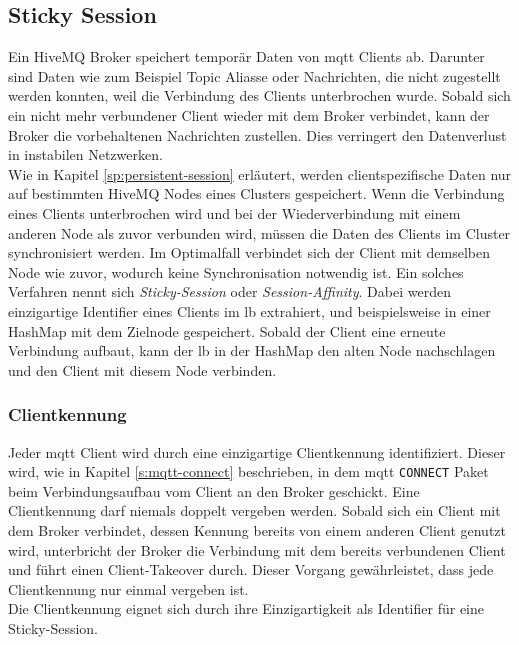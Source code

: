 \subsection{Sticky Session} \label{ss:sticky-session}
Ein HiveMQ Broker speichert temporär Daten von \ac{mqtt} Clients ab. Darunter sind Daten wie zum Beispiel Topic Aliasse oder Nachrichten, die nicht zugestellt werden konnten, weil die Verbindung des Clients unterbrochen wurde.
Sobald sich ein nicht mehr verbundener Client wieder mit dem Broker verbindet, kann der Broker die vorbehaltenen Nachrichten zustellen.
Dies verringert den Datenverlust in instabilen Netzwerken.
\\
Wie in Kapitel \ref{sp:persistent-session} erläutert, werden clientspezifische Daten nur auf bestimmten HiveMQ Nodes eines Clusters gespeichert.
Wenn die Verbindung eines Clients unterbrochen wird und bei der Wiederverbindung mit einem anderen Node als zuvor verbunden wird, müssen die Daten des Clients im Cluster synchronisiert werden.
Im Optimalfall verbindet sich der Client mit demselben Node wie zuvor, wodurch keine Synchronisation notwendig ist.
Ein solches Verfahren nennt sich \textit{Sticky-Session} oder \textit{Session-Affinity}. Dabei werden einzigartige Identifier eines Clients im \acl{lb} extrahiert, und beispielsweise in einer HashMap mit dem Zielnode gespeichert. Sobald der Client eine erneute Verbindung aufbaut, kann der \acl{lb} in der HashMap den alten Node nachschlagen und den Client mit diesem Node verbinden. \cite{WhatDoesTerm}

\subsubsection{Clientkennung} \label{ss:clientid}
Jeder \ac{mqtt} Client wird durch eine einzigartige Clientkennung identifiziert. Dieser wird, wie in Kapitel \ref{s:mqtt-connect} beschrieben, in dem \ac{mqtt} \verb|CONNECT| Paket beim Verbindungsaufbau vom Client an den Broker geschickt.
Eine Clientkennung darf niemals doppelt vergeben werden. Sobald sich ein Client mit dem Broker verbindet, dessen Kennung bereits von einem anderen Client genutzt wird, unterbricht der Broker die Verbindung mit dem bereits verbundenen Client und führt einen Client-Takeover durch.
Dieser Vorgang gewährleistet, dass jede Clientkennung nur einmal vergeben ist.
\\
Die Clientkennung eignet sich durch ihre Einzigartigkeit als Identifier für eine Sticky-Session.

